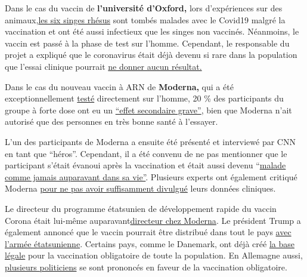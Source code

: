 Dans le cas du vaccin de \textbf{l'université d'Oxford,} lors
d'expériences sur des
animaux,\href{https://www.dailymail.co.uk/sciencetech/article-8331709/Oxford-coronavirus-vaccine-does-not-stop-infection-experts-warn.html}{les
six singes rhésus} sont tombés malades avec le Covid19 malgré la
vaccination et ont été aussi infectieux que les singes non vaccinés.
Néanmoins, le vaccin est passé à la phase de test sur l'homme.
Cependant, le responsable du projet a expliqué que le coronavirus était
déjà devenu si rare dans la population que l'essai clinique pourrait
\href{https://www.telegraph.co.uk/news/2020/05/23/oxford-university-covid-19-vaccine-trial-has-50-per-cent-chance/}{ne
donner aucun résultat.}

Dans le cas du nouveau vaccin à ARN de \textbf{Moderna,} qui a été
exceptionnellement
\href{https://www.statnews.com/2020/03/11/researchers-rush-to-start-moderna-coronavirus-vaccine-trial-without-usual-animal-testing/}{testé}
directement sur l'homme, 20 \% des participants du groupe à forte dose
ont eu un
\href{https://childrenshealthdefense.org/news/vaccine-trial-catastrophe-moderna-vaccine-has-20-serious-injury-rate-in-high-dose-group/}{``effet
secondaire grave''}, bien que Moderna n'ait autorisé que des personnes
en très bonne santé à l'essayer.

L'un des participants de Moderna a ensuite été présenté et interviewé
par CNN en tant que ``héros''. Cependant, il a été convenu de ne pas
mentionner que le participant s'était évanoui après la vaccination et
était aussi devenu
``\href{https://childrenshealthdefense.org/news/modernas-guinea-pig-sickest-in-his-life-after-being-injected-with-experimental-vaccine/}{malade
comme jamais auparavant dans sa vie''}. Plusieurs experts ont également
critiqué Moderna
\href{https://www.statnews.com/2020/05/19/vaccine-experts-say-moderna-didnt-produce-data-critical-to-assessing-covid-19-vaccine/}{pour
ne pas avoir suffisamment divulgué} leurs données cliniques.

Le directeur du programme étatsunien de développement rapide du vaccin
Corona était lui-même
auparavant\href{https://www.businessinsider.com/moncef-slaoui-leading-trump-vaccine-push-10m-holding-moderna-conflict-2020-5}{directeur
chez Moderna}. Le président Trump a également annoncé que le vaccin
pourrait être distribué dans tout le pays
\href{https://www.msn.com/en-us/news/politics/trump-says-hes-mobilizing-military-to-distribute-potential-coronavirus-vaccine/ar-BB1463uZ}{avec
l'armée étatsunienne}. Certains pays, comme le Danemark, ont déjà créé
\href{https://www.thelocal.dk/20200313/denmark-passes-far-reaching-emergency-coronavirus-law}{la
base légale} pour la vaccination obligatoire de toute la population. En
Allemagne aussi,
\href{https://www.swp.de/panorama/corona-impfpflicht-wird-die-impfung-bald-zur-vorschrift-in-deutschland_-das-ist-der-momentane-stand-45785279.html}{plusieurs
politiciens} se sont prononcés en faveur de la vaccination obligatoire.


